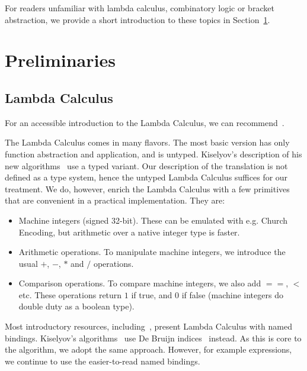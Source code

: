 \documentclass[conference]{IEEEtran}
\begin{document}
For readers unfamiliar with lambda calculus, combinatory logic or bracket abstraction, we provide a short introduction to these topics in Section~\ref{sec:prelim}.

\section{Preliminaries}
\label{sec:prelim}
\subsection{Lambda Calculus}
For an accessible introduction to the Lambda Calculus, we can recommend~\cite{rojas_tutorial_2015}.

The Lambda Calculus comes in many flavors.
The most basic version has only function abstraction and application, and is untyped.
Kiselyov's description of his new algorithms~\cite{kiselyov_lambda_2018} use a typed variant.
Our description of the translation is not defined as a type system, hence the untyped Lambda Calculus suffices for our treatment.
We do, however, enrich the Lambda Calculus with a few primitives that are convenient in a practical implementation. They are:
\begin{itemize}
    \item Machine integers (signed 32-bit). These can be emulated with e.g. Church Encoding, but arithmetic over a native integer type is faster.
    \item Arithmetic operations. To manipulate machine integers, we introduce the usual $+$, $-$, $*$ and $/$ operations.
    \item Comparison operations. To compare machine integers, we also add $==$, $<$ etc. These operations return $1$ if true, and $0$ if false (machine integers do double duty as a boolean type).
\end{itemize}

Most introductory resources, including~\cite{rojas_tutorial_2015}, present Lambda Calculus with named bindings.
Kiselyov's algorithms~\cite{kiselyov_lambda_2018} use De Bruijn indices~\cite{de_bruijn_lambda_1972} instead.
As this is core to the algorithm, we adopt the same approach.
However, for example expressions, we continue to use the easier-to-read named bindings.
\end{document}
